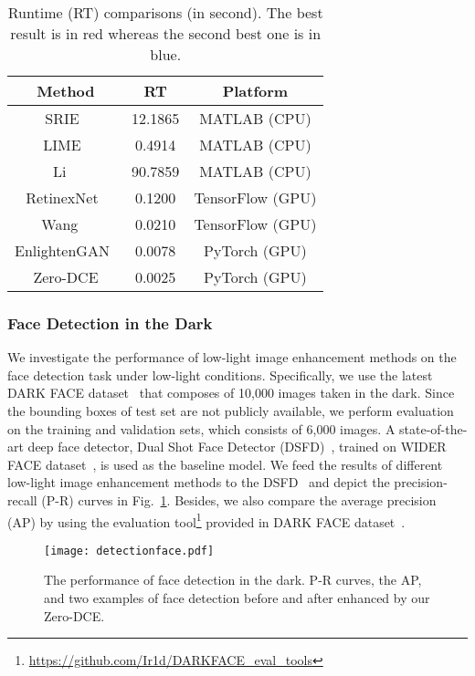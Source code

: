 \documentclass[10pt,twocolumn,letterpaper]{article}
\begin{document}
\begin{table}[t]
\caption{Runtime (RT) comparisons (in second). The best result is in red whereas the second best one is in blue.}
	\vspace{-0.2cm}
	\centering
	\begin{tabular}{c|c|c}
		\hline
		\textbf{Method} & \textbf{RT} & \textbf{Platform} \\
		\hline
		SRIE~\cite{Fu2016}           &  12.1865                            & MATLAB (CPU) \\
		LIME~\cite{Guo2017}          &  0.4914                             & MATLAB (CPU)\\
		Li \etal~\cite{Li2018}       &  90.7859                            & MATLAB (CPU) \\
		RetinexNet~\cite{Chen2018}   &  0.1200                             & TensorFlow (GPU)\\
		Wang \etal~\cite{Wang2019}      &  0.0210                           & TensorFlow (GPU)\\
		EnlightenGAN~\cite{Jiang2019}&  {\color{blue}0.0078}              & PyTorch (GPU)\\
		Zero-DCE                     &  {\color{red}0.0025}                & PyTorch (GPU)\\
		\hline
	\end{tabular}
	\vspace{-8pt}
	\label{table_2}
\end{table}



\vspace{-10pt}
\subsubsection{Face Detection in the Dark}
We investigate the performance of low-light image enhancement methods on the face detection task under low-light conditions. Specifically, we use the latest DARK FACE dataset~\cite{2019arXiv190404474Y} that composes of 10,000 images taken in the dark.
Since the bounding boxes of test set are not publicly available, we perform evaluation on the training and validation sets, which consists of 6,000 images.
A state-of-the-art deep face detector, Dual Shot Face Detector (DSFD)~\cite{DSFD}, trained on WIDER FACE dataset~\cite{WIDER}, is used as the baseline model. We feed the results of different low-light image enhancement methods to the DSFD~\cite{DSFD} and depict the precision-recall (P-R) curves in Fig.~\ref{fig:PR}. Besides, we also compare the average precision (AP) by using the evaluation tool\footnote[5]{\url{https://github.com/Ir1d/DARKFACE_eval_tools}} provided in DARK FACE dataset~\cite{2019arXiv190404474Y}.
\begin{figure}[htb]
	\vspace{-0.9cm}
	\centering
	\centerline{\texttt{[image: detectionface.pdf]}}
		\vspace{-0.3cm}
	\caption{The performance of face detection in the dark. P-R curves, the AP, and two examples of face detection before and after enhanced by our Zero-DCE.}
	\label{fig:PR}
		\vspace{-0.55cm}
\end{figure}
\end{document}
